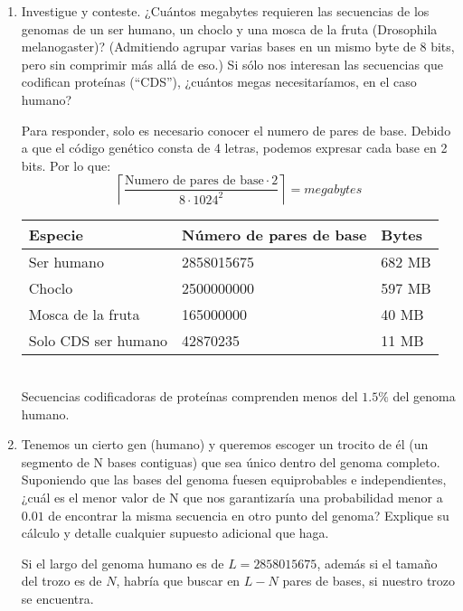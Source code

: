 \begin{enumerate}
\item Investigue y conteste.
	¿Cuántos megabytes requieren las secuencias
	de los genomas de un ser humano, un choclo y una mosca
	de la fruta (Drosophila melanogaster)?
	(Admitiendo agrupar varias bases en un mismo byte de
	8 bits, pero sin comprimir más allá de eso.)
	Si sólo nos interesan las secuencias que codifican
	proteínas (“CDS”), ¿cuántos megas necesitaríamos,
	en el caso humano?
	
		Para responder, solo es necesario conocer el
		numero de pares de base.
		Debido a que el código genético consta de 4 letras,
		podemos expresar cada base en 2 bits. Por lo que: \\

		$$\left\lceil \frac{\text{Numero de pares de base} \cdot 2}{8 \cdot 1024^2} \right\rceil = megabytes$$

		\begin{center}
		\begin{tabular}{|l|l|l|}
		\hline
			\textbf{Especie}  & \textbf{Número de pares de base} & \textbf{Bytes} \\\hline
			Ser humano        & 2858015675 & 682 MB\\
			Choclo            & 2500000000 & 597 MB\\
			Mosca de la fruta & 165000000  & 40 MB\\
			Solo CDS ser humano \red{(*)}
							  & 42870235   & 11 MB\\\hline
		\end{tabular}\\

		\red{(*)} Secuencias codificadoras de proteínas comprenden menos
			del $1.5\%$ del genoma humano.
		\end{center}


\item Tenemos un cierto gen (humano) y queremos escoger un
	trocito de él (un segmento de N bases contiguas) que sea
	único dentro del genoma completo.
	Suponiendo que las bases del genoma fuesen equiprobables e
	independientes,
	¿cuál es el menor valor de N que nos garantizaría una probabilidad
	menor a $0.01$ de encontrar la misma secuencia en otro punto del
	genoma? Explique su cálculo y detalle cualquier supuesto adicional
	que haga.


		Si el largo del genoma humano es de $L = 2858015675$,
		además si el tamaño del trozo es de $N$, habría que buscar en
		$L - N$ pares de bases, si nuestro trozo se encuentra.\\


\end{enumerate}
